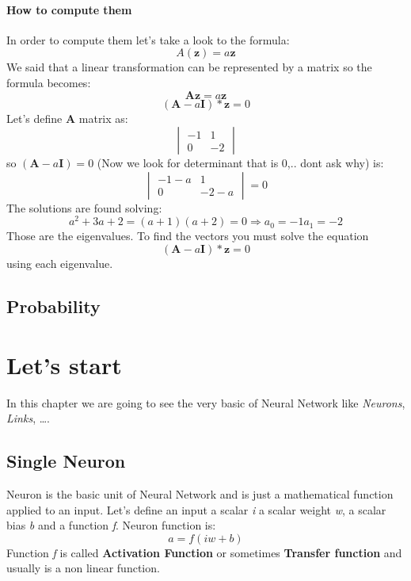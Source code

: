 \documentclass[12pt,a4paper,twoside,openright]{scrbook}
\begin{document}
\subsubsection{How to compute them}
In order to compute them let's  take a look to the formula:
\[ A(\textbf{z}) = a\textbf{z} \]
We said that a linear transformation can be represented by a matrix so the formula becomes:
 \[ \textbf{A}\textbf{z} = a\textbf{z} \]
 \[(\textbf{A} - a\textbf{I}) * \textbf{z} = 0\]
 Let's define \textbf{A} matrix as:
 \[\begin{vmatrix}
-1 & 1\\0 & -2 
 \end{vmatrix}\]
 so $(\textbf{A} - a\textbf{I}) = 0$ (Now we look for determinant that is 0,.. dont ask why) is:
  \[\begin{vmatrix}
-1 - a & 1\\0 & -2 - a
 \end{vmatrix} = 0 \]
The solutions are found solving:
\[a^2 + 3a + 2 = (a + 1)(a + 2) = 0 \Rightarrow a_0 = -1 a_1=-2\]
Those are the eigenvalues. To find the vectors you must solve the equation \[(\textbf{A} - a\textbf{I}) * \textbf{z} = 0\] using each eigenvalue.

\section{Probability}




\chapter{Let's start}

In this chapter we are going to see the very basic of Neural Network like \textit{Neurons}, \textit{Links}, \ldots.

\section{Single Neuron}
Neuron is the basic unit of Neural Network and is just a mathematical function applied to an input.
Let's define an input a scalar \textit{i} a scalar weight \textit{w}, a scalar bias \textit{b} and a function \textit{f}.
Neuron function is:
\begin{equation}
a = f(iw + b)
\end{equation}
Function \textit{f} is called \textbf{Activation Function} or sometimes \textbf{Transfer function} and usually is a non linear function.
\end{document}
